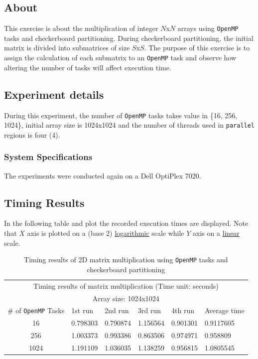 \documentclass{article}
\def\code#1{\texttt{#1}}
\begin{document}
\subsection{About}
This exercise is about the multiplication of integer $N$x$N$ arrays using \texttt{OpenMP} tasks
and checkerboard partitioning. During checkerboard partitioning, the initial matrix is divided
into submatrices of size $S$x$S$. The purpose of this exercise is to assign the calculation
of each submatrix to an \texttt{OpenMP} task and observe how altering the number of tasks
will affect execution time.

\subsection{Experiment details}
During this experiment, the number of \texttt{OpenMP} tasks takes value in \{16, 256, 1024\},
initial array size is 1024x1024 and the number of threads used in \code{parallel} regions is
four (4).

\subsubsection{System Specifications}
The experiments were conducted again on a Dell OptiPlex 7020.


\subsection{Timing Results}
In the following table and plot the recorded execution times are displayed.
Note that $X$ axis is plotted on a (base 2) \underline{logarithmic} scale while
$Y$ axis on a \underline{linear} scale.

\newpage

\begin{table}[htbp]
  \centering
    \begin{tabular}{|c||l|l|l|l|l|} 
    \hline
    \multicolumn{6}{|c|}{Timing results of matrix multiplication (Time unit: seconds)} \\
    \multicolumn{6}{|c|}{Array size: 1024x1024} \\
    \hline
   \# of \texttt{OpenMP} Tasks & 1st run & 2nd run & 3rd run & 4th run & Average time\\ [0.5ex] 
    \hline\hline
    16 & 0.798303 & 0.790874 & 1.156564 & 0.901301 & 0.9117605 \\ 
    \hline
    256 & 1.003373 & 0.993386 & 0.863506 & 0.974971 & 0.958809 \\
    \hline
    1024 & 1.191109 & 1.036035 & 1.138259 & 0.956815 & 1.0805545 \\ [1ex]
    \hline
    \end{tabular}
  \caption{Timing results of 2D matrix multiplication using \texttt{OpenMP}
           tasks and checkerboard partitioning}
\end{table}
\end{document}
